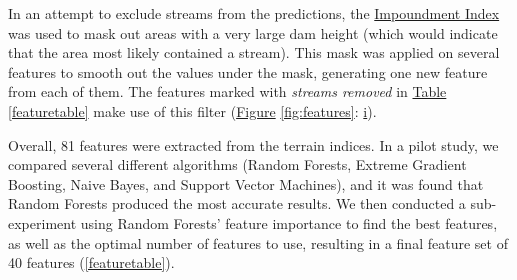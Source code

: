 \documentclass[11pt, review]{elsarticle} %
\begin{document}
\label{impoundmentstreamremoval}
In an attempt to exclude streams from the predictions, the \hyperref[impoundment]{Impoundment Index} was used to mask out areas with a very large dam height (which would indicate that the area most likely contained a stream). This mask was applied on several features to smooth out the values under the mask, generating one new feature from each of them. The features marked with \textit{streams removed} in \hyperref[featuretable]{Table} \ref{featuretable} make use of this filter (\hyperref[fig:features]{Figure} \ref{fig:features}: \hyperref[fig:features]{i}).

Overall, 81 features were extracted from the terrain indices. In a pilot study, we compared several different algorithms (Random Forests, Extreme Gradient Boosting, Naive Bayes, and Support Vector Machines), and it was found that Random Forests produced the most accurate results. We then conducted a sub-experiment using Random Forests' feature importance to find the best features, as well as the optimal number of features to use, resulting in a final feature set of 40 features (\autoref{featuretable}).
\end{document}

